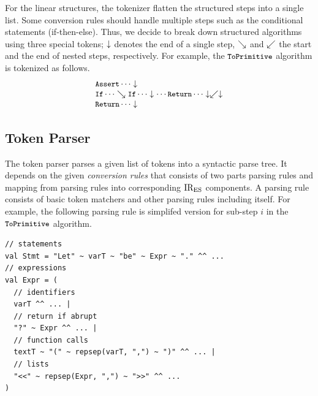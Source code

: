 For the linear structures, the tokenizer flatten the structured steps into
a single list. Some conversion rules should handle multiple steps such as
the conditional statements (if-then-else). Thus, we decide to break down
structured algorithms using three special tokens;
\( \downarrow \) denotes the end of a single step,
\( \searrow \) and \( \swarrow \) the start and the end of nested steps, respectively.
For example, the \( \texttt{\small ToPrimitive} \) algorithm is tokenized as follows.
\[
  \begin{array}{l}
    \texttt{\small Assert} \cdots \downarrow\\
    \texttt{\small If} \cdots \searrow \texttt{\small If} \cdots \downarrow
    \cdots \texttt{\small Return} \cdots \downarrow \swarrow \downarrow\\
    \texttt{\small Return} \cdots \downarrow\\
  \end{array}
\]

\subsection{Token Parser}

The token parser parses a given list of tokens into a syntactic parse tree.
It depends on the given \textit{conversion rules} that consists of
two parts parsing rules and mapping from parsing rules into corresponding
\( \text{IR}_\text{ES} \) components.
A parsing rule consists of basic token matchers and other parsing rules
including itself. For example, the following parsing rule is simplifed version for
sub-step \( i \) in the \( \texttt{\small ToPrimitive} \) algorithm.
\begin{lstlisting}[style=myScalastyle]
// statements
val Stmt = "Let" ~ varT ~ "be" ~ Expr ~ "." ^^ ...
// expressions
val Expr = (
  // identifiers
  varT ^^ ... |
  // return if abrupt
  "?" ~ Expr ^^ ... |
  // function calls
  textT ~ "(" ~ repsep(varT, ",") ~ ")" ^^ ... |
  // lists
  "<<" ~ repsep(Expr, ",") ~ ">>" ^^ ...
)
\end{lstlisting}


